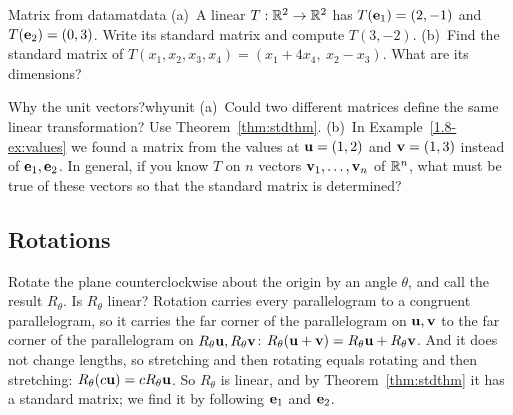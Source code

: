 \documentclass[11pt]{article}
\begin{document}
\begin{kc}{Matrix from data}{matdata}
(a)~A linear $T:\mathbb{R}^2\to\mathbb{R}^2$ has $T(\mathbf{e}_1)=(2,-1)$ and $T(\mathbf{e}_2)=(0,3)$. Write its standard matrix and compute $T(3,-2)$. (b)~Find the standard matrix of $T(x_1,x_2,x_3,x_4)=(x_1+4x_4,\ x_2-x_3)$. What are its dimensions?
\end{kc}

\begin{think}{Why the unit vectors?}{whyunit}
(a)~Could two different matrices define the same linear transformation? Use Theorem~\ref{thm:stdthm}. (b)~In Example~\ref{1.8-ex:values} we found a matrix from the values at $\mathbf{u}=(1,2)$ and $\mathbf{v}=(1,3)$ instead of $\mathbf{e}_1,\mathbf{e}_2$. In general, if you know $T$ on $n$ vectors $\mathbf{v}_1,\dots,\mathbf{v}_n$ of $\mathbb{R}^n$, what must be true of these vectors so that the standard matrix is determined?
\end{think}

\subsection*{Rotations}

Rotate the plane counterclockwise about the origin by an angle $\theta$, and call the result $R_\theta$. Is $R_\theta$ linear? Rotation carries every parallelogram to a congruent parallelogram, so it carries the far corner of the parallelogram on $\mathbf{u},\mathbf{v}$ to the far corner of the parallelogram on $R_\theta\mathbf{u},R_\theta\mathbf{v}$: $R_\theta(\mathbf{u}+\mathbf{v})=R_\theta\mathbf{u}+R_\theta\mathbf{v}$. And it does not change lengths, so stretching and then rotating equals rotating and then stretching: $R_\theta(c\mathbf{u})=cR_\theta\mathbf{u}$. So $R_\theta$ is linear, and by Theorem~\ref{thm:stdthm} it has a standard matrix; we find it by following $\mathbf{e}_1$ and $\mathbf{e}_2$.

\begin{center}
\end{center}
\end{document}

